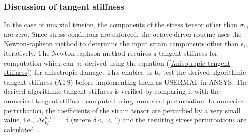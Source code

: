 \documentclass[12pt,a4paper,twoside,openright]{report}
\begin{document}
\subsubsection{Discussion of tangent stiffness}
\indent\indent\indent In the case of uniaxial tension, the components of the stress tensor other than $\sigma_{11}$ are zero. Since stress conditions are enforced, the octave driver routine \citep{codes} uses the Newton-raphson method to determine the input strain components other than $\epsilon_{11}$ iteratively. The Newton-raphson method requires a tangent stiffness for computation which can be derived using the equation (\ref{Anisotropic tangent stiffness}) for anisotropic damage. This enables us to test the derived algorithmic tangent stiffness (ATS) before implementing them as USERMAT in ANSYS. The derived algorithmic tangent stiffness is verified by comparing it with the numerical tangent stiffness computed using numerical perturbation. In numerical perturbation, the coefficients of the strain tensor are perturbed by a very small value, i.e.,  $\Delta\epsilon_{kl}^{n+1} = \delta$ (where $\delta<<1$) and the resulting stress perturbations are calculated \citep{codes}. 
\end{document}
